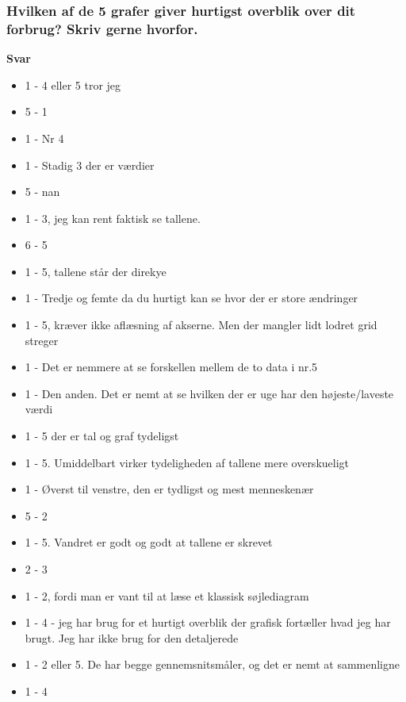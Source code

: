\subsubsection{Hvilken af de 5 grafer giver hurtigst overblik over dit forbrug? Skriv gerne hvorfor.}
\textbf{Svar}
\begin{itemize}
    \item 1 - 4 eller 5 tror jeg
    \item 5 - 1
    \item 1 - Nr 4
    \item 1 - Stadig 3 der er værdier
    \item 5 - nan
    \item 1 - 3, jeg kan rent faktisk se tallene.
    \item 6 - 5
    \item 1 - 5, tallene står der direkye
    \item 1 - Tredje og femte da du hurtigt kan se hvor der er store ændringer
    \item 1 - 5, kræver ikke aflæsning af akserne. Men der mangler lidt lodret grid streger
    \item 1 - Det er nemmere at se forskellen mellem de to data i nr.5
    \item 1 - Den anden. Det er nemt at se hvilken der er uge har den højeste/laveste værdi
    \item 1 - 5 der er tal og graf tydeligst
    \item 1 - 5. Umiddelbart virker tydeligheden af tallene mere overskueligt
    \item 1 - Øverst til venstre, den er tydligst og mest menneskenær
    \item 5 - 2
    \item 1 - 5. Vandret er godt og godt at tallene er skrevet
    \item 2 - 3
    \item 1 - 2, fordi man er vant til at læse et klassisk søjlediagram
    \item 1 - 4 - jeg har brug for et hurtigt overblik der grafisk fortæller hvad jeg har brugt. Jeg har ikke brug for den detaljerede
    \item 1 - 2 eller 5. De har begge gennemsnitsmåler, og det er nemt at sammenligne
    \item 1 - 4
\end{itemize}

